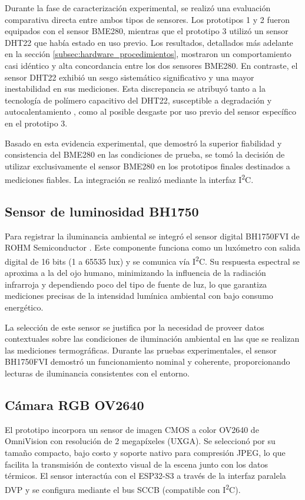     Durante la fase de caracterización experimental, se realizó una evaluación comparativa directa entre ambos tipos de sensores. Los prototipos 1 y 2 fueron equipados con el sensor BME280, mientras que el prototipo 3 utilizó un sensor DHT22 que había estado en uso previo. Los resultados, detallados más adelante en la sección \ref{subsec:hardware_procedimientos}, mostraron un comportamiento casi idéntico y alta concordancia entre los dos sensores BME280. En contraste, el sensor DHT22 exhibió un sesgo sistemático significativo y una mayor inestabilidad en sus mediciones. Esta discrepancia se atribuyó tanto a la tecnología de polímero capacitivo del DHT22, susceptible a degradación y autocalentamiento , como al posible desgaste por uso previo del sensor específico en el prototipo 3.

    Basado en esta evidencia experimental, que demostró la superior fiabilidad y consistencia del BME280 en las condiciones de prueba, se tomó la decisión de utilizar exclusivamente el sensor BME280 en los prototipos finales destinados a mediciones fiables. La integración se realizó mediante la interfaz I\textsuperscript{2}C.

    \subsection{Sensor de luminosidad BH1750}
    \label{subsec:hardware_bh1750}
    Para registrar la iluminancia ambiental se integró el sensor digital BH1750FVI de ROHM Semiconductor . Este componente funciona como un luxómetro con salida digital de 16 bits (1 a 65535 lux) y se comunica vía I\textsuperscript{2}C. Su respuesta espectral se aproxima a la del ojo humano, minimizando la influencia de la radiación infrarroja y dependiendo poco del tipo de fuente de luz, lo que garantiza mediciones precisas de la intensidad lumínica ambiental con bajo consumo energético.

    La selección de este sensor se justifica por la necesidad de proveer datos contextuales sobre las condiciones de iluminación ambiental en las que se realizan las mediciones termográficas. Durante las pruebas experimentales, el sensor BH1750FVI demostró un funcionamiento nominal y coherente, proporcionando lecturas de iluminancia consistentes con el entorno.

    \subsection{Cámara RGB OV2640}
    \label{subsec:hardware_ov2640}
    El prototipo incorpora un sensor de imagen CMOS a color OV2640 de OmniVision  con resolución de 2 megapíxeles (UXGA). Se seleccionó por su tamaño compacto, bajo costo y soporte nativo para compresión JPEG, lo que facilita la transmisión de contexto visual de la escena junto con los datos térmicos. El sensor interactúa con el ESP32-S3 a través de la interfaz paralela DVP y se configura mediante el bus SCCB (compatible con I\textsuperscript{2}C).

